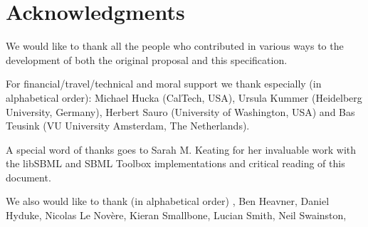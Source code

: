
\section{Acknowledgments}

We would like to thank all the people who contributed in various ways to the development of both the original proposal and this specification.

For financial/travel/technical and moral support we thank especially (in alphabetical order): Michael Hucka (CalTech, USA), Ursula Kummer (Heidelberg University, Germany), Herbert Sauro (University of Washington, USA) and Bas Teusink (VU University Amsterdam, The Netherlands).

A special word of thanks goes to Sarah M. Keating for her invaluable work with the \textsf{libSBML} and \textsf{SBML Toolbox} implementations and critical reading of this document.

We also would like to thank (in alphabetical order) , Ben Heavner, Daniel Hyduke, Nicolas Le Nov\`{e}re, Kieran Smallbone, Lucian Smith, Neil Swainston, 


